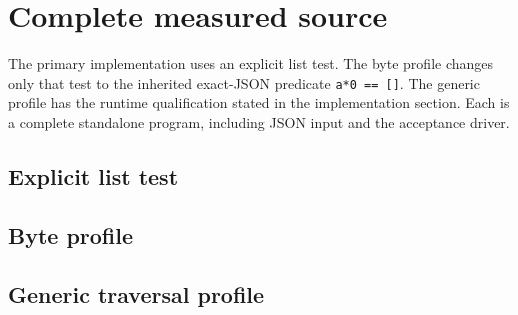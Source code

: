 \documentclass[11pt,letterpaper]{article}
\theoremstyle{definition}\newtheorem{definition}[theorem]{Definition}
\theoremstyle{remark}\newtheorem{remark}[theorem]{Remark}
\begin{document}
\section{Complete measured source}
The primary implementation uses an explicit list test. The byte profile
changes only that test to the inherited exact-JSON predicate
\texttt{a*0 == []}. The generic profile has the runtime qualification
stated in the implementation section. Each is a complete standalone
program, including JSON input and the acceptance driver.
\subsection{Explicit list test}

\subsection{Byte profile}

\subsection{Generic traversal profile}

\clearpage

\end{document}
